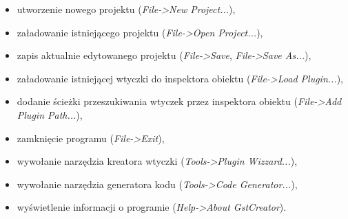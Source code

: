 \documentclass[12pt]{article}
\begin{document}
\begin{itemize}
  \setlength{\itemsep}{0em}
\item utworzenie nowego projektu (\textit{File->New Project...}),
\item załadowanie istniejącego projektu (\textit{File->Open Project...}),
\item zapis aktualnie edytowanego projektu (\textit{File->Save}, \textit{File->Save As...}),
\item załadowanie istniejącej wtyczki do inspektora obiektu (\textit{File->Load Plugin...}),
\item dodanie ścieżki przeszukiwania wtyczek przez inspektora obiektu (\textit{File->Add Plugin Path...}),
\item zamknięcie programu (\textit{File->Exit}),
\item wywołanie narzędzia kreatora wtyczki (\textit{Tools->Plugin Wizzard...}),
\item wywołanie narzędzia generatora kodu (\textit{Tools->Code Generator...}),
\item wyświetlenie informacji o programie (\textit{Help->About GstCreator}).
\end{itemize}
\end{document}

